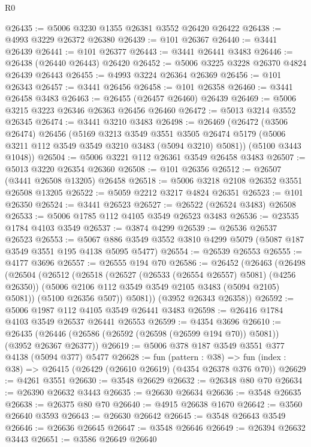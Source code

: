 \begin{lexlean}{R0}
\begin{coremodule}
@26435 := @5006 @3230 @1355 @26381 @3552 @26420 @26422
@26438 := @4993 @3229 @26372 @26380
@26439 := @101 @26367
@26440 := @3441 @26439
@26441 := @101 @26377
@26443 := @3441 @26441 @3483
@26446 := @26438 (@26440 @26443) @26420
@26452 := @5006 @3225 @3228 @26370 @4824 @26439 @26443
@26455 := @4993 @3224 @26364 @26369
@26456 := @101 @26343
@26457 := @3441 @26456
@26458 := @101 @26358
@26460 := @3441 @26458 @3483
@26463 := @26455 (@26457 @26460) @26439
@26469 := @5006 @3215 @3223 @26346 @26363 @26456 @26460
@26472 := @5013 @3214 @3552 @26345
@26474 := @3441 @3210 @3483
@26498 := @26469
    (@26472
      (@3506 @26474)
      @26456
      (@5169
        @3213
        @3549
        @3551
        @3505
        @26474
        @5179
        (@5006 @3211 @112 @3549 @3549 @3210 @3483 (@5094 @3210) @5081))
      (@5100 @3443 @1048))
@26504 := @5006 @3221 @112 @26361 @3549 @26458 @3483
@26507 := @5013 @3220 @26354 @26360
@26508 := @101 @26356
@26512 := @26507 (@3441 @26508 @13205) @26458
@26518 := @5006 @3218 @2108 @26352 @3551 @26508 @13205
@26522 := @5059 @2212 @3217 @4824 @26351
@26523 := @101 @26350
@26524 := @3441 @26523
@26527 := @26522 (@26524 @3483) @26508
@26533 := @5006 @1785 @112 @4105 @3549 @26523 @3483
@26536 := @23535 @1784 @4103 @3549
@26537 := @3874 @4299
@26539 := @26536 @26537 @26523
@26553 := @5067 @886 @3549 @3552 @3810 @4299 @5079 (@5087 @187 @3549 @3551 @195 @4138 @5095 @5477)
@26554 := @26539 @26553
@26555 := @4177 @3696
@26557 := @26555 @194 @70
@26586 := @26452
    (@26463
      (@26498
        (@26504
          (@26512
            (@26518
              (@26527 (@26533 (@26554 @26557) @5081) (@4256 @26350))
              (@5006 @2106 @112 @3549 @3549 @2105 @3483 (@5094 @2105) @5081))
            (@5100 @26356 @507))
          @5081))
      (@3952 @26343 @26358))
@26592 := @5006 @1987 @112 @4105 @3549 @26441 @3483
@26598 := @26416 @1784 @4103 @3549 @26537 @26441 @26553
@26599 := @4354 @3696
@26610 := @26435 (@26446 (@26586 (@26592 (@26598 (@26599 @194 @70)) @5081)) (@3952 @26367 @26377))
@26619 := @5006 @378 @187 @3549 @3551 @377 @4138 (@5094 @377) @5477
@26628 := fun (pattern : @38) =>
  fun (index : @38) => @26415 (@26429 (@26610 @26619) (@4354 @26378 @376 @70))
@26629 := @4261 @3551
@26630 := @3548 @26629
@26632 := @26348 @80 @70
@26634 := @26390 @26632 @3443
@26635 := @26630 @26634
@26636 := @3548 @26635
@26638 := @26375 @80 @70
@26640 := @4915 @26638 @1670
@26642 := @3560 @26640 @3593
@26643 := @26630 @26642
@26645 := @3548 @26643 @3549
@26646 := @26636 @26645
@26647 := @3548 @26646
@26649 := @26394 @26632 @3443
@26651 := @3586 @26649 @26640

\end{coremodule}
\end{lexlean}
